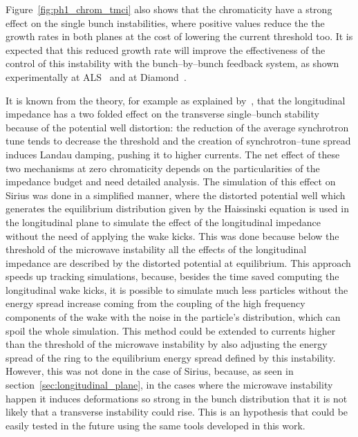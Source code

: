     Figure~\ref{fig:ph1_chrom_tmci} also shows that the chromaticity have a strong effect on the single bunch instabilities, where positive values reduce the the growth rates in both planes at the cost of lowering the current threshold too. It is expected that this reduced growth rate will improve the effectiveness of the control of this instability with the bunch--by--bunch feedback system, as shown experimentally at ALS~\cite{Byrd1997} and at Diamond~\cite{Koukovini-Platia2017}.

    It is known from the theory, for example as explained by~, that the longitudinal impedance has a two folded effect on the transverse single--bunch stability because of the potential well distortion: the reduction of the average synchrotron tune tends to decrease the threshold and the creation of synchrotron--tune spread induces Landau damping, pushing it to higher currents. The net effect of these two mechanisms at zero chromaticity depends on the particularities of the impedance budget and need detailed analysis. The simulation of this effect on Sirius was done in a simplified manner, where the distorted potential well which generates the equilibrium distribution given by the Haissinski equation is used in the longitudinal plane to simulate the effect of the longitudinal impedance without the need of applying the wake kicks. This was done because below the threshold of the microwave instability all the effects of the longitudinal impedance are described by the distorted potential at equilibrium. This approach speeds up tracking simulations, because, besides the time saved computing the longitudinal wake kicks, it is possible to simulate much less particles without the energy spread increase coming from the coupling of the high frequency components of the wake with the noise in the particle's distribution, which can spoil the whole simulation. This method could be extended to currents higher than the threshold of the microwave instability by also adjusting the energy spread of the ring to the equilibrium energy spread defined by this instability. However, this was not done in the case of Sirius, because, as seen in section~\ref{sec:longitudinal_plane}, in the cases where the microwave instability happen it induces deformations so strong in the bunch distribution that it is not likely that a transverse instability could rise. This is an hypothesis that could be easily tested in the future using the same tools developed in this work.

